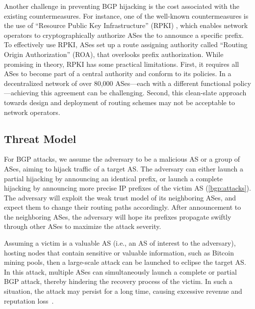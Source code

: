 \documentclass[5p]{elsarticle}
\begin{document}
Another challenge in preventing BGP hijacking is the cost associated with the existing countermeasures. For instance, one of the well-known countermeasures is the use of ``Resource Public Key Infrastructure'' (RPKI) \cite{rfc8481}, which enables network operators to cryptographically authorize ASes the to announce a specific prefix. To effectively use RPKI, ASes set up a route assigning authority called ``Routing Origin Authorization'' (ROA), that overlooks prefix authorization. While promising in theory, RPKI has some practical limitations. First, it requires all ASes to become part of a central authority and conform to its policies. In a decentralized network of over 80,000 ASes---each with a different functional policy---achieving this agreement can be challenging. Second, this clean-slate approach towards design and deployment of routing schemes may not be acceptable to network operators. 

\subsection{Threat Model} \label{sec:tm}
For BGP attacks, we assume the adversary to be a malicious AS or a group of ASes, aiming to hijack traffic of a target AS. The adversary can either launch a partial hijacking by announcing an identical prefix, or launch a complete hijacking by announcing more precise IP prefixes of the victim AS (\textsection\ref{bgp:attacks}). The adversary will exploit the weak trust model of its neighboring ASes, and expect them to change their routing paths accordingly. After announcement to the neighboring ASes, the adversary will hope its prefixes propagate swiftly through other ASes to maximize the attack severity. 

Assuming a victim is a valuable AS (i.e., an AS of interest to the adversary), hosting nodes that contain sensitive or valuable information, such as Bitcoin mining pools, then a large-scale attack can be launched to eclipse the target AS. In this attack, multiple ASes can simultaneously launch a complete or partial BGP attack, thereby hindering the recovery process of the victim. In such a situation, the attack may persist for a long time, causing excessive revenue and reputation loss~\cite{BangeraG11}.
\end{document}
